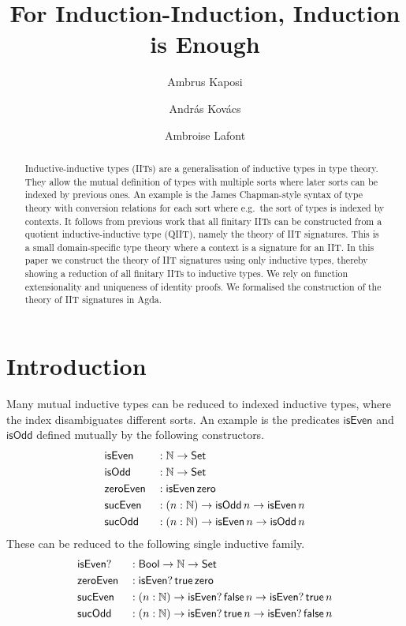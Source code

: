 \documentclass[a4paper,UKenglish,cleveref, autoref]{lipics-v2019}
\title{For Induction-Induction, Induction is Enough} %
\author{Ambrus Kaposi}{E{\"o}tv{\"o}s Lor{\'a}nd University, Budapest, Hungary}{akaposi@inf.elte.hu}{https://orcid.org/0000-0001-9897-8936}{this author was supported by Thematic Excellence Programme, Industry and Digitization Subprogramme (NRDI Office, 2019) and by the European Union, co-financed by the European Social Fund (EFOP-3.6.2-16-2017-00013, Thematic Fundamental Research Collaborations Grounding Innovation in Informatics and Infocommunication).}%
\author{Andr{\'a}s Kov{\'a}cs}{E{\"o}tv{\"o}s Lor{\'a}nd University, Budapest, Hungary}{kovacsandras@inf.elte.hu}{https://orcid.org/0000-0002-6375-9781}{this author was supported by the European Union, co-financed by the European Social Fund (EFOP-3.6.3-VEKOP-16-2017-00002).}
\author{Ambroise Lafont}{IMT Atlantique, Inria, LS2N CNRS, Nantes, France}{ambroise.lafont@inria.fr}{https://orcid.org/0000-0002-9299-641X}{}
\begin{document}
\maketitle

\begin{abstract}
  Inductive-inductive types (IITs) are a generalisation of inductive types in
  type theory. They allow the mutual definition of types with multiple sorts
  where later sorts can be indexed by previous ones. An example is the James
  Chapman-style syntax of type theory with conversion relations for each sort
  where e.g.\ the sort of types is indexed by contexts. It follows from previous
  work that all finitary IITs can be constructed from a quotient
  inductive-inductive type (QIIT), namely the theory of IIT signatures. This is
  a small domain-specific type theory where a context is a signature for an
  IIT. In this paper we construct the theory of IIT signatures using only inductive types,
  thereby showing a reduction of all finitary IITs to inductive types.  We rely
  on function extensionality and uniqueness of identity proofs. We formalised
  the construction of the theory of IIT signatures in Agda.
\end{abstract}

\section{Introduction}
\label{sec:intro}

Many mutual inductive types can be reduced to indexed inductive types, where the
index disambiguates different sorts. An example is the predicates
$\mathsf{isEven}$ and $\mathsf{isOdd}$ defined mutually by the following
constructors.
\begin{alignat*}{5}
  & \mathsf{isEven} && : \mathbb{N}\rightarrow\mathsf{Set} \\
  & \mathsf{isOdd} && : \mathbb{N}\rightarrow \mathsf{Set} \\
  & \mathsf{zeroEven} && : \mathsf{isEven}\,\mathsf{zero} \\
  & \mathsf{sucEven} && : (n:\mathbb{N})\rightarrow\mathsf{isOdd}\,n\rightarrow\mathsf{isEven}\,n \\
  & \mathsf{sucOdd} && : (n:\mathbb{N})\rightarrow\mathsf{isEven}\,n\rightarrow\mathsf{isOdd}\,n
\end{alignat*}
These can be reduced to the following single inductive family.
\begin{alignat*}{5}
  & \mathsf{isEven?} && : \mathsf{Bool}\rightarrow\mathbb{N}\rightarrow\mathsf{Set} \\
  & \mathsf{zeroEven} && : \mathsf{isEven?}\,\mathsf{true}\,\mathsf{zero} \\
  & \mathsf{sucEven} && : (n:\mathbb{N})\rightarrow\mathsf{isEven?}\,\mathsf{false}\,n\rightarrow\mathsf{isEven?}\,\mathsf{true}\,n \\
  & \mathsf{sucOdd} && : (n:\mathbb{N})\rightarrow\mathsf{isEven?}\,\mathsf{true}\,n\rightarrow\mathsf{isEven?}\,\mathsf{false}\,n
\end{alignat*}
\end{document}

